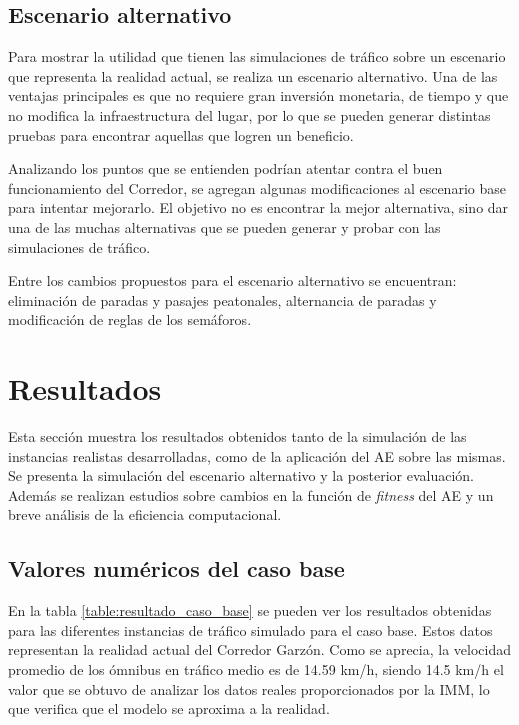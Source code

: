  

\subsection{Escenario alternativo}

Para mostrar la utilidad que tienen las simulaciones de tráfico sobre un escenario que representa la realidad actual, se realiza un escenario alternativo. Una de las ventajas principales es que no requiere gran inversión monetaria, de tiempo y que no modifica la infraestructura del lugar, por lo que se pueden generar distintas pruebas para encontrar aquellas que logren un beneficio.

Analizando los puntos que se entienden podrían atentar contra el buen funcionamiento del Corredor, se agregan algunas modificaciones al escenario base para intentar mejorarlo. El objetivo no es encontrar la mejor alternativa, sino dar una de las muchas alternativas que se pueden generar y probar con las simulaciones de tráfico.

Entre los cambios propuestos para el escenario alternativo se encuentran: eliminación de paradas y pasajes peatonales, alternancia de paradas y modificación de reglas de los semáforos.



\section{Resultados}
Esta sección muestra los resultados obtenidos tanto de la simulación de las instancias realistas desarrolladas, como de la aplicación del AE sobre las mismas. Se presenta la simulación del escenario alternativo y la posterior evaluación. Además se realizan estudios sobre cambios en la función de \emph{fitness} del AE y un breve análisis de la eficiencia computacional.


\subsection{Valores numéricos del caso base}

En la tabla \ref{table:resultado_caso_base} se pueden ver los resultados obtenidas para las diferentes instancias de tráfico simulado para el caso base. Estos datos representan la realidad actual del Corredor Garzón. Como se aprecia, la velocidad promedio de los ómnibus en tráfico medio es de 14.59 km/h, siendo 14.5 km/h el valor que se obtuvo de analizar los datos reales proporcionados por la IMM, lo que verifica que el modelo se aproxima a la realidad. 
 
